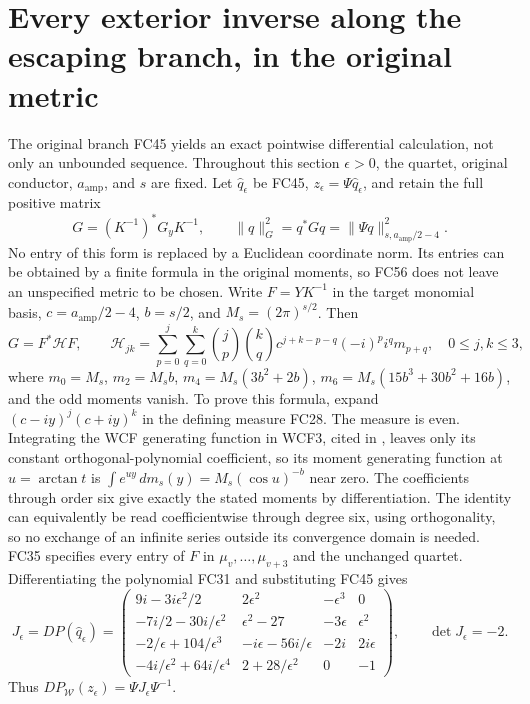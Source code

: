 \documentclass[11pt]{article}
\begin{document}
\section{Every exterior inverse along the escaping branch, in the original metric}
The original branch FC45 yields an exact pointwise differential calculation,
not only an unbounded sequence. Throughout this section $\epsilon>0$, the
quartet, original conductor, $a_{\mathrm{amp}}$, and $s$ are fixed. Let
$\widehat q_\epsilon$ be FC45, $z_\epsilon=\Psi\widehat q_\epsilon$,
and retain the full positive matrix
\[
 G=(K^{-1})^*G_yK^{-1},\qquad
 \|q\|_G^2=q^*Gq=\|\Psi q\|_{s,a_{\mathrm{amp}}/2-4}^2.
 \tag{FC56}
\]
No entry of this form is replaced by a Euclidean coordinate norm.
Its entries can be obtained by a finite formula in the original moments,
so FC56 does not leave an unspecified metric to be chosen. Write
$F=YK^{-1}$ in the target monomial basis, $c=a_{\mathrm{amp}}/2-4$,
$b=s/2$, and $M_s=(2\pi)^{s/2}$. Then
\[
 G=F^*\mathcal H F,\qquad
 \mathcal H_{jk}=\sum_{p=0}^j\sum_{q=0}^k
 \binom jp\binom kq c^{j+k-p-q}(-i)^p i^q m_{p+q},
 \quad 0\le j,k\le3,
 \tag{FC56a}
\]
where $m_0=M_s$, $m_2=M_sb$, $m_4=M_s(3b^2+2b)$,
$m_6=M_s(15b^3+30b^2+16b)$, and the odd moments vanish.
To prove this formula, expand
$(c-iy)^j(c+iy)^k$ in the defining measure FC28. The measure is
even. Integrating the WCF generating function in WCF3, cited in
\cite{WCF}, leaves only its constant orthogonal-polynomial coefficient,
so its moment generating function at $u=\arctan t$ is
$\int e^{uy}\,dm_s(y)=M_s(\cos u)^{-b}$ near zero. The coefficients
through order six give exactly the stated moments by differentiation.
The identity can equivalently be read coefficientwise through degree
six, using orthogonality, so no exchange of an infinite series outside
its convergence domain is needed. FC35 specifies every entry of $F$
in $\mu_v,\ldots,\mu_{v+3}$ and the unchanged quartet.
Differentiating the polynomial FC31 and substituting FC45 gives
\[
 J_\epsilon=DP(\widehat q_\epsilon)=
 \begin{pmatrix}
 9i-3i\epsilon^2/2&2\epsilon^2&-\epsilon^3&0\\
 -7i/2-30i/\epsilon^2&\epsilon^2-27&-3\epsilon&\epsilon^2\\
 -2/\epsilon+104/\epsilon^3&-i\epsilon-56i/\epsilon&-2i&2i\epsilon\\
 -4i/\epsilon^2+64i/\epsilon^4&2+28/\epsilon^2&0&-1
 \end{pmatrix},\qquad \det J_\epsilon=-2.
 \tag{FC57}
\]
Thus $D P_{\mathcal W}(z_\epsilon)=\Psi J_\epsilon\Psi^{-1}$.
\end{document}
